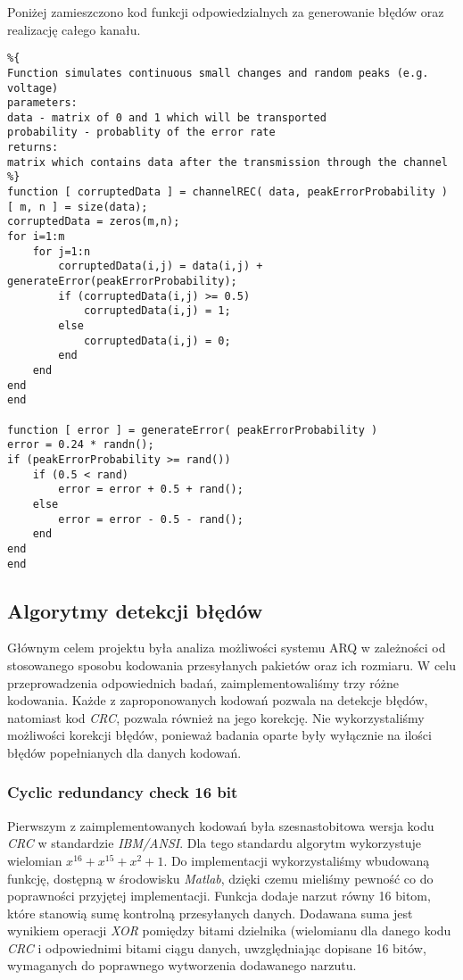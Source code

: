 \documentclass{article}
\begin{document}
Poniżej zamieszczono kod funkcji odpowiedzialnych za generowanie błędów oraz realizację całego kanału.

\begin{verbatim}
%{
Function simulates continuous small changes and random peaks (e.g. voltage)
parameters:
data - matrix of 0 and 1 which will be transported
probability - probablity of the error rate
returns:
matrix which contains data after the transmission through the channel
%}
function [ corruptedData ] = channelREC( data, peakErrorProbability )
[ m, n ] = size(data);
corruptedData = zeros(m,n);
for i=1:m
    for j=1:n
        corruptedData(i,j) = data(i,j) + generateError(peakErrorProbability);
        if (corruptedData(i,j) >= 0.5)
            corruptedData(i,j) = 1;
        else
            corruptedData(i,j) = 0;
        end
    end
end
end

function [ error ] = generateError( peakErrorProbability )
error = 0.24 * randn();
if (peakErrorProbability >= rand())
    if (0.5 < rand)
        error = error + 0.5 + rand();
    else
        error = error - 0.5 - rand();
    end
end
end
\end{verbatim}

\subsection{Algorytmy detekcji błędów}  \label{Kodowania}

Głównym celem projektu była analiza możliwości systemu ARQ w zależności od stosowanego sposobu kodowania przesyłanych pakietów oraz ich rozmiaru. W celu przeprowadzenia odpowiednich badań, zaimplementowaliśmy trzy różne kodowania. Każde z zaproponowanych kodowań pozwala na detekcje błędów, natomiast kod \textit{CRC}, pozwala również na jego korekcję. Nie wykorzystaliśmy możliwości korekcji błędów, ponieważ badania oparte były wyłącznie na ilości błędów popełnianych dla danych kodowań.

\subsubsection{Cyclic redundancy check 16 bit}

Pierwszym z zaimplementowanych kodowań była szesnastobitowa wersja kodu \textit{CRC} w standardzie \textit{IBM/ANSI}. Dla tego standardu algorytm wykorzystuje wielomian $x^{16}+x^{15}+x^2+1$. Do implementacji wykorzystaliśmy wbudowaną funkcję, dostępną w środowisku \textit{Matlab}, dzięki czemu mieliśmy pewność co do poprawności przyjętej implementacji. Funkcja dodaje narzut równy 16 bitom, które stanowią sumę kontrolną przesyłanych danych. Dodawana suma jest wynikiem operacji \textit{XOR} pomiędzy bitami dzielnika (wielomianu dla danego kodu \textit{CRC} i odpowiednimi bitami ciągu danych, uwzględniając dopisane 16 bitów, wymaganych do poprawnego wytworzenia dodawanego narzutu.
\end{document}
